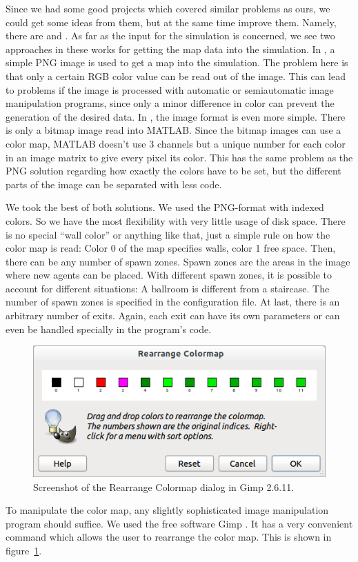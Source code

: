 \documentclass[11pt]{article}
\begin{document}
\label{sub:input}

Since we had some good projects which covered similar
problems as ours, we could get some ideas from them, but at the same time
improve them.  Namely, there are \cite{multilevel} and \cite{airplane}.  As far
as the input for the simulation is concerned, we see two approaches in these
works for getting the map data into the simulation.  In \cite{multilevel}, a
simple PNG image is used to get a map into the simulation. The problem here is
that only a certain RGB color value can be read out of the image.  This can
lead to problems if the image is processed with automatic or semiautomatic
image manipulation programs, since only a minor difference in color can prevent
the generation of the desired data.  In \cite{airplane}, the image format is
even more simple.  There is only a bitmap image read into MATLAB.  Since the
bitmap images can use a color map, MATLAB doesn't use 3 channels but a unique
number for each color in an image matrix to give every pixel its color.  This
has the same problem as the PNG solution regarding how exactly the colors have
to be set, but the different parts of the image can be separated with less
code.

We took the best of both solutions. We used the PNG-format with indexed colors.
So we have the most flexibility with very little usage of disk space.  There is
no special ``wall color'' or anything like that, just a simple rule on how the
color map is read: Color 0 of the map specifies walls, color 1 free space.
Then, there can be any number of spawn zones.  Spawn zones are the areas in the
image where new agents can be placed. With different spawn zones, it is
possible to account for different situations: A ballroom is different from a
staircase.  The number of spawn zones is specified in the configuration file.
At last, there is an arbitrary number of exits.  Again, each exit can have its
own parameters or can even be handled specially in the program's code. 

\begin{figure}[h]
	\centering
	\includegraphics[scale=0.5]{images/gimp.png}
	\caption{Screenshot of the Rearrange Colormap dialog in Gimp 2.6.11.}
	\label{gimpscreenshot}
	
\end{figure}
To manipulate the color map, any slightly sophisticated image manipulation
program should suffice. We used the free software Gimp \cite{gimp}. It has a
very convenient command which allows the user to rearrange the color map. This
is shown in figure~\ref{gimpscreenshot}.
\end{document}
